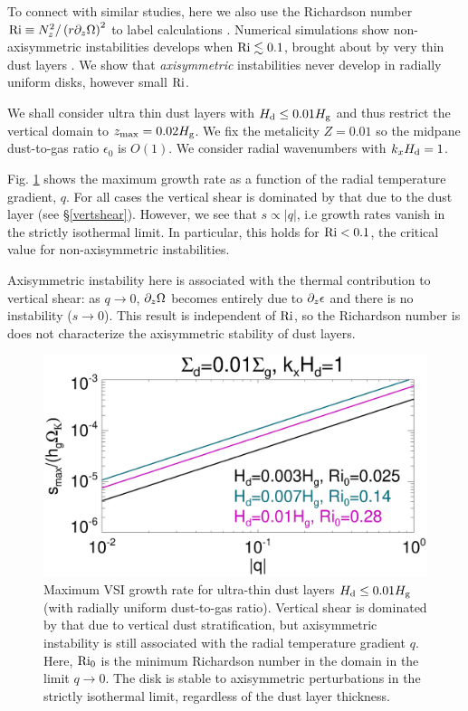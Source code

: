 To connect with similar studies, here  we also use 
the Richardson number $\mathrm{Ri} \equiv N_z^2/\left(r\partial_z\Omega\right)^2$
to label calculations \citep{youdin02}.   
Numerical simulations show    
non-axisymmetric instabilities develops when $\mathrm{Ri}\lesssim0.1$, brought about
by very thin dust layers \citep{chiang08, lee10}. We show that \emph{axisymmetric}
instabilities never develop in radially uniform disks, however small $\mathrm{Ri}$. 

We shall consider ultra thin dust layers with $H_\mathrm{d}\leq 0.01H_\mathrm{g}$ and thus
restrict the vertical domain to $z_\mathrm{max} = 0.02H_\mathrm{g}$. We fix the 
metalicity $Z=0.01$ so the midpane dust-to-gas ratio $\epsilon_0$ is 
$O(1)$.  We consider radial wavenumbers with $k_xH_\mathrm{d}=1$. 

Fig. \ref{ultra_thin} shows the maximum growth rate  as a function of
the radial temperature gradient, $q$. For all cases the vertical
shear is dominated by that due to the dust layer (see
\S\ref{vertshear}). However, we see that $s\propto
|q|$, i.e growth rates vanish in the strictly isothermal limit.  
In particular, this holds for $\mathrm{Ri} < 0.1$, the critical value 
for non-axisymmetric instabilities. 

Axisymmetric instability here is associated with the thermal
contribution to vertical shear: as $q\to0$,  $\partial_z\Omega$ becomes
entirely due to $\partial_z\epsilon$ and there is no instability ($s\to
0$). This result is independent of $\mathrm{Ri}$, so the Richardson number
is does not characterize the axisymmetric stability of dust
layers. 

\begin{figure}
  \includegraphics[width=\linewidth]{figures/compare_eigenvals_thindust} 
  \caption{Maximum VSI growth rate for ultra-thin dust layers $H_\mathrm{d} 
    \leq 0.01H_\mathrm{g}$ (with radially uniform dust-to-gas  ratio). Vertical shear is dominated by that due to 
    vertical dust stratification, but axisymmetric instability is still 
    associated with the radial temperature gradient $q$. 
 Here, $\mathrm{Ri}_0$ is the minimum 
    Richardson number in the domain in the limit $q\to0$. The disk is stable to axisymmetric perturbations 
    in the strictly isothermal limit, regardless of the dust layer thickness. 
    \label{ultra_thin}
    }
\end{figure}




